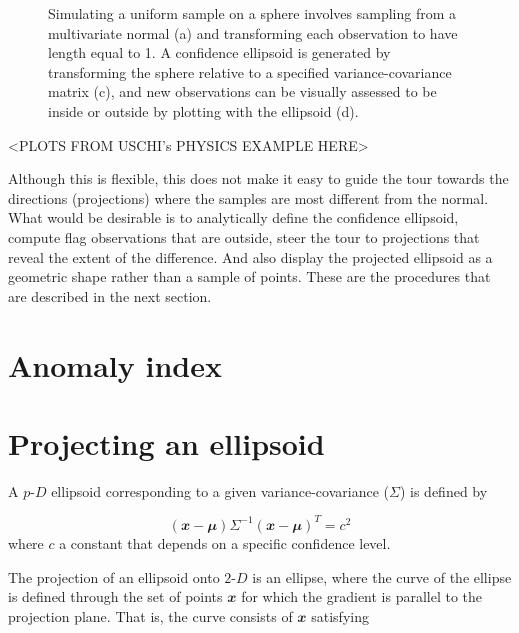 \documentclass[
  12pt]{article}
\newcommand\pD{$p\text{-}D$}
\newcommand\gD{$2\text{-}D$}
\begin{document}
\begin{figure}


\caption{\label{fig-ci}Simulating a uniform sample on a sphere involves
sampling from a multivariate normal (a) and transforming each
observation to have length equal to 1. A confidence ellipsoid is
generated by transforming the sphere relative to a specified
variance-covariance matrix (c), and new observations can be visually
assessed to be inside or outside by plotting with the ellipsoid (d).}

\end{figure}%

\textless PLOTS FROM USCHI's PHYSICS EXAMPLE HERE\textgreater{}

Although this is flexible, this does not make it easy to guide the tour
towards the directions (projections) where the samples are most
different from the normal. What would be desirable is to analytically
define the confidence ellipsoid, compute flag observations that are
outside, steer the tour to projections that reveal the extent of the
difference. And also display the projected ellipsoid as a geometric
shape rather than a sample of points. These are the procedures that are
described in the next section.

\section{Anomaly index}\label{sec-anomaly-index}

\section{Projecting an ellipsoid}\label{projecting-an-ellipsoid}

A \pD{} ellipsoid corresponding to a given variance-covariance
(\(\Sigma\)) is defined by

\[
(\mathbfit{x}-\mathbfit{\mu}) \Sigma^{-1}(\mathbfit{x}-\mathbfit{\mu})^T = c^2
\] where \(c\) a constant that depends on a specific confidence level.

The projection of an ellipsoid onto \gD{} is an ellipse, where the curve
of the ellipse is defined through the set of points \(\mathbfit{x}\) for
which the gradient is parallel to the projection plane. That is, the
curve consists of \(\mathbfit{x}\) satisfying
\end{document}

